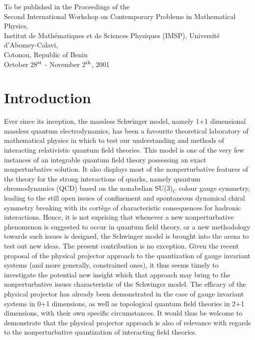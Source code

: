 \documentclass[a4paper,11pt]{article}
\begin{document}
\begin{titlepage}
\begin{centering}
\begin{abstract}
\end{abstract}

\vspace{25pt}
 
To be published in the Proceedings of the\\
Second International Workshop on Contemporary Problems in Mathematical
Physics,\\
Institut de Math\'ematiques et de Sciences Physiques (IMSP), Universit\'e
d'Abomey-Calavi,\\
Cotonou, Republic of Benin\\
October 28$^{\rm st}$ - November 2$^{\rm th}$, 2001

\end{centering} 

\vspace{100pt}


\end{titlepage}

\section{Introduction}
\label{Sect1}

Ever since its inception,\cite{Schwinger} the massless Schwinger model, namely
1+1 dimensional massless quantum electrodynamics, has been a favourite
theoretical laboratory of mathematical physics in which to test our
understanding and methods of interacting relativistic quantum field theories. 
This model is one of the very few instances of an integrable quantum 
field theory possessing an exact nonperturbative 
solution.\cite{Schwinger,SchM1,Manton,Hetrick} It also displays most of
the nonperturbative features of the theory for the strong interactions
of quarks, namely quantum chromodynamics (QCD) based on the nonabelian
SU(3)$_C$ colour gauge symmetry, leading to the still open
issues of confinement and spontaneous dynamical chiral symmetry breaking 
with its cort\`ege of cha\-rac\-te\-ris\-tic consequences for hadronic 
interactions.  Hence, it is not suprising that whenever a new nonperturbative 
phenomenon is suggested to occur in quantum field theory, or a new methodology
towards such issues is designed, the Schwinger model is brought
into the arena to test out new ideas. The present contribution is no exception.
Given the recent proposal\cite{Klauder} of the physical projector approach 
to the quantization of gauge invariant systems (and more generally, 
constrained ones),\cite{Gov1}
it thus seems timely to investigate the potential new insight which that
approach may bring to the nonperturbative issues characteristic of the
Schwinger model. The efficacy of the physical projector has already been
demonstrated in the case of gauge invariant systems in 0+1 
dimensions,\cite{Gov2} as well as topological quantum field theories in 2+1 
dimensions,\cite{Gov3} with their own specific circumstances. It would thus 
be welcome to demonstrate that the physical projector approach is also of 
relevance with regards to the nonperturbative quantization of interacting 
field theories.
\end{document}

